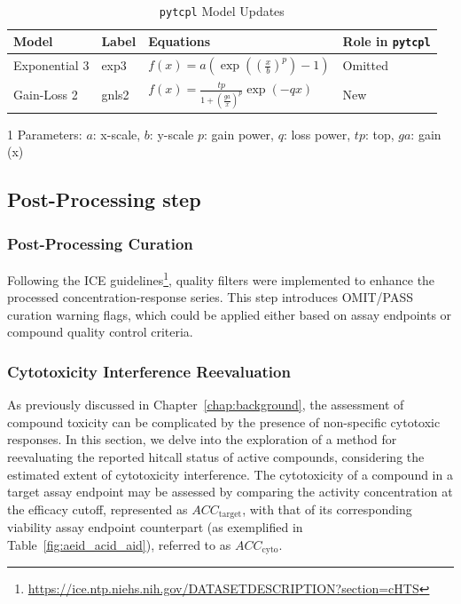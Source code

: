 \begin{table}[h]
    \caption{\texttt{pytcpl} Model Updates}~\label{table:pytcpl_models}
    \centering
    \begin{threeparttable}[b]
    \begin{tabular}{llll}
    \toprule
    \textbf{Model} & \textbf{Label} & \textbf{Equations\tnote{1}} & \textbf{Role in} \texttt{pytcpl} \\
    \midrule
    Exponential 3 & exp3 & \(f(x) = a\left(\exp\left({\left(\frac{x}{b}\right)}^{p}\right) - 1\right)\) & Omitted \\
    Gain-Loss 2 & gnls2 & \(f(x) = \frac{tp}{1 + {\left(\frac{ga}{x}\right)}^{p}}\exp\left({-qx}\right)\) & New \\
    \bottomrule
    \end{tabular}
    \begin{tablenotes}
        \item [1] Parameters: $a$: x-scale, $b$: y-scale $p$: gain power, $q$: loss power, $tp$: top, $ga$: gain (x)
    \end{tablenotes}
\end{threeparttable}
\end{table}

\subsection{Post-Processing step}
\subsubsection{Post-Processing Curation}
Following the ICE guidelines\footnote{\url{https://ice.ntp.niehs.nih.gov/DATASETDESCRIPTION?section=cHTS}}, quality filters were implemented to enhance the processed concentration-response series. This step introduces OMIT/PASS curation warning flags, which could be applied either based on assay endpoints or compound quality control criteria.

\subsubsection{Cytotoxicity Interference Reevaluation}
As previously discussed in Chapter~\ref{chap:background}, the assessment of compound toxicity can be complicated by the presence of non-specific cytotoxic responses. In this section, we delve into the exploration of a method for reevaluating the reported hitcall status of active compounds, considering the estimated extent of cytotoxicity interference. The cytotoxicity of a compound in a target assay endpoint may be assessed by comparing the activity concentration at the efficacy cutoff, represented as $ACC_{\text{target}}$, with that of its corresponding viability assay endpoint counterpart (as exemplified in Table~\ref{fig:aeid_acid_aid}), referred to as $ACC_{\text{cyto}}$. 

